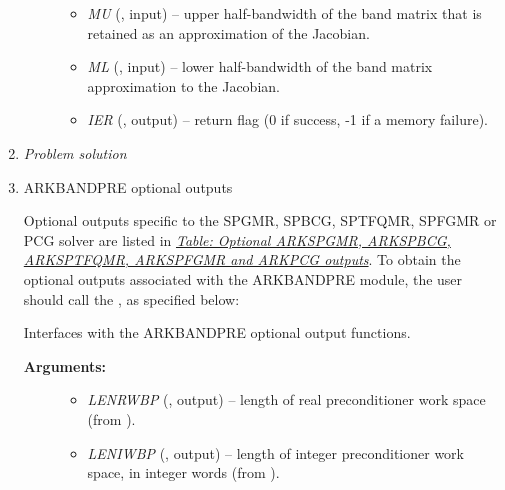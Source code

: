 \documentclass[letterpaper,10pt,english]{sphinxmanual}
\begin{document}
\begin{enumerate}
\begin{fulllineitems}
\begin{description}
\begin{itemize}
\item {} 
\emph{MU} (, input) -- upper half-bandwidth of the
band matrix that is retained as an approximation of the
Jacobian.

\item {} 
\emph{ML}  (, input) -- lower half-bandwidth of the
band matrix approximation to the Jacobian.

\item {} 
\emph{IER}  (, output) -- return flag  (0 if success, -1
if a memory failure).

\end{itemize}

\end{description}

\end{fulllineitems}


\item {} 
\emph{Problem solution}

\item {} 
ARKBANDPRE optional outputs

Optional outputs specific to the SPGMR, SPBCG, SPTFQMR, SPFGMR or
PCG solver are listed in {\hyperref[f_interface/Optional_output:finterface-spilsiouttable]{\emph{Table: Optional ARKSPGMR, ARKSPBCG, ARKSPTFQMR, ARKSPFGMR and ARKPCG outputs}}}.  To
obtain the optional outputs associated with the ARKBANDPRE module,
the user should call the {\hyperref[f_interface/Preconditioning:f/_/FARKBPOPT]{}}, as specified below:

\begin{fulllineitems}
\label{f_interface/Preconditioning:f/_/FARKBPOPT}
Interfaces with the ARKBANDPRE optional output functions.
\begin{description}
\item[{\textbf{Arguments:}}] \leavevmode\begin{itemize}
\item {} 
\emph{LENRWBP} (, output) -- length of real
preconditioner work space (from
{\hyperref[c_interface/Preconditioners:ARKBandPrecGetWorkSpace]{}}).

\item {} 
\emph{LENIWBP} (, output) -- length of integer
preconditioner work space, in integer words (from
{\hyperref[c_interface/Preconditioners:ARKBandPrecGetWorkSpace]{}}).


\end{itemize}
\end{description}
\end{fulllineitems}
\end{enumerate}
\end{document}
